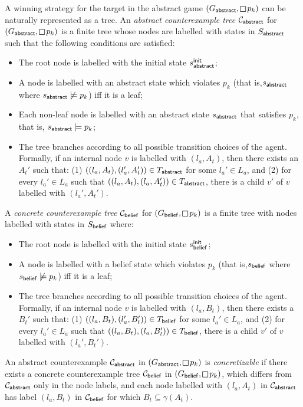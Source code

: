 A winning strategy for the target in the abstract game $(G_\abstr,\LTLglobally p_k)$ can be naturally represented as a tree. 
An \emph{abstract counterexample tree} $\mathcal{C}_{\mathsf{abstract}}$ for $(G_\abstr,\LTLglobally p_k)$ is a finite tree  whose nodes are labelled with states in $S_{\mathsf{abstract}}$ such that the following conditions are satisfied:
\begin{itemize}
\item The root node is labelled with the initial state $s_{\mathsf{abstract}}^{\mathsf{init}}$;
\item A node is labelled with an abstract state  which violates $p_k$ (that is,$s_{\mathsf{abstract}}$ where $s_{\mathsf{abstract}} \not\models p_k$) iff it is a leaf;
\item Each non-leaf node is labelled with an abstract state $s_{\mathsf{abstract}}$ that satisfies $p_k$, that is, $s_{\mathsf{abstract}} \models p_k$; 
\item The tree branches according to all possible transition choices of the agent. Formally, if an internal node $v$ is labelled with $(l_a,A_t)$, then there exists an $A_t'$  such that: (1) $((l_a,A_t),(l_a',A_t')) \in T_{\mathsf{abstract}}$ for some $l_a' \in L_a$, and (2) for every $l_a' \in L_a$ such that $((l_a,A_t),(l_a,A_t')) \in T_{\mathsf{abstract}}$, there is a child $v'$ of $v$ labelled with $(l_a',A_t')$.
\end{itemize}

A \emph{concrete counterexample tree} $\mathcal{C}_{\mathsf{belief}}$ for $(G_\belief,\LTLglobally p_k)$ is a finite tree with nodes labelled with states in $S_{\mathsf{belief}}$ where:
\begin{itemize}
\item The root node is labelled with the initial state $s_{\mathsf{belief}}^{\mathsf{init}}$;
\item A node is labelled with a belief state which violates $p_k$ (that is,$s_{\mathsf{belief}}$ where $s_{\mathsf{belief}} \not\models p_k$) iff it is a leaf;
\item The tree branches according to all possible transition choices of the agent. Formally, if an internal node $v$ is labelled with $(l_a,B_t)$, then there exists a $B_t'$  such that: (1) $((l_a,B_t),(l_a',B_t')) \in T_{\mathsf{belief}}$ for some $l_a' \in L_a$, and (2) for every $l_a' \in L_a$ such that $((l_a,B_t),(l_a,B_t')) \in T_{\mathsf{belief}}$, there is a child $v'$ of $v$ labelled with $(l_a',B_t')$.
\end{itemize}

An abstract counterexample $\mathcal{C}_{\mathsf{abstract}}$ in $(G_\abstr,\LTLglobally p_k)$ is \emph{concretizable} if there exists a concrete counterexample 
tree $\mathcal{C}_{\mathsf{belief}}$ in $(G_\belief,\LTLglobally p_k)$, which differs from $\mathcal{C}_{\mathsf{abstract}}$ only in the node labels, and each node labelled with $(l_a,A_t)$ in $\mathcal{C}_{\mathsf{abstract}}$ has label $(l_a, B_t)$ in $\mathcal{C}_{\mathsf{belief}}$ for which $B_t \subseteq \gamma(A_t)$.


